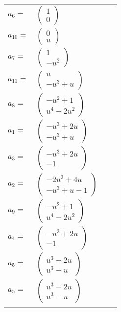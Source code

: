 \documentclass[1p]{elsarticle_modified}
\theoremstyle{definition}
\begin{document}
\begin{tabular}{m{7pt} m{180pt} m{7pt} m{180pt} }
\flushright $a_{6}=$&$\begin{pmatrix}1\\0\end{pmatrix}$ \\
\flushright $a_{10}=$&$\begin{pmatrix}0\\u\end{pmatrix}$ \\
\flushright $a_{7}=$&$\begin{pmatrix}1\\- u^2\end{pmatrix}$ \\
\flushright $a_{11}=$&$\begin{pmatrix}u\\- u^3+u\end{pmatrix}$ \\
\flushright $a_{8}=$&$\begin{pmatrix}- u^2+1\\u^4-2 u^2\end{pmatrix}$ \\
\flushright $a_{1}=$&$\begin{pmatrix}- u^3+2 u\\- u^3+u\end{pmatrix}$ \\
\flushright $a_{3}=$&$\begin{pmatrix}- u^3+2 u\\-1\end{pmatrix}$ \\
\flushright $a_{2}=$&$\begin{pmatrix}-2 u^3+4 u\\- u^3+u-1\end{pmatrix}$ \\
\flushright $a_{9}=$&$\begin{pmatrix}- u^2+1\\u^4-2 u^2\end{pmatrix}$ \\
\flushright $a_{4}=$&$\begin{pmatrix}- u^3+2 u\\-1\end{pmatrix}$ \\
\flushright $a_{5}=$&$\begin{pmatrix}u^3-2 u\\u^3- u\end{pmatrix}$\\ \flushright $a_{5}=$&$\begin{pmatrix}u^3-2 u\\u^3- u\end{pmatrix}$\\&\end{tabular}
\end{document}
